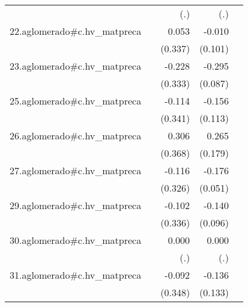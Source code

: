 {\begin{longtable}{l*{4}{D{.}{.}{-1}}}
            &                     &         (.)         &         (.)         &                     \\
\addlinespace
22.aglomerado#c.hv\_matpreca&                     &       0.053         &      -0.010         &                     \\
            &                     &     (0.337)         &     (0.101)         &                     \\
\addlinespace
23.aglomerado#c.hv\_matpreca&                     &      -0.228         &      -0.295\sym{***}&                     \\
            &                     &     (0.333)         &     (0.087)         &                     \\
\addlinespace
25.aglomerado#c.hv\_matpreca&                     &      -0.114         &      -0.156         &                     \\
            &                     &     (0.341)         &     (0.113)         &                     \\
\addlinespace
26.aglomerado#c.hv\_matpreca&                     &       0.306         &       0.265         &                     \\
            &                     &     (0.368)         &     (0.179)         &                     \\
\addlinespace
27.aglomerado#c.hv\_matpreca&                     &      -0.116         &      -0.176\sym{***}&                     \\
            &                     &     (0.326)         &     (0.051)         &                     \\
\addlinespace
29.aglomerado#c.hv\_matpreca&                     &      -0.102         &      -0.140         &                     \\
            &                     &     (0.336)         &     (0.096)         &                     \\
\addlinespace
30.aglomerado#c.hv\_matpreca&                     &       0.000         &       0.000         &                     \\
            &                     &         (.)         &         (.)         &                     \\
\addlinespace
31.aglomerado#c.hv\_matpreca&                     &      -0.092         &      -0.136         &                     \\
            &                     &     (0.348)         &     (0.133)         &                     \\

\end{longtable}}
